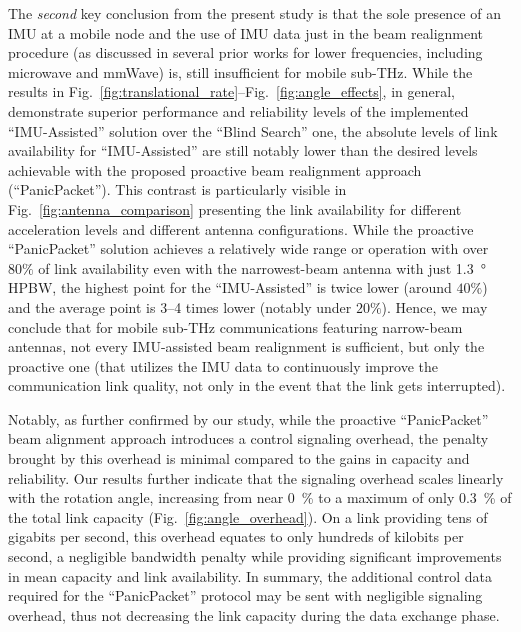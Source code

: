 \documentclass[fleqn,10pt]{wlscirep}
\begin{document}
The \emph{second} key conclusion from the present study is that the sole presence of an IMU at a mobile node and the use of IMU data just in the beam realignment procedure (as discussed in several prior works for lower frequencies, including microwave and mmWave) is, still insufficient for mobile sub-THz. While the results in Fig.~\ref{fig:translational_rate}--Fig.~\ref{fig:angle_effects}, in general, demonstrate superior performance and reliability levels of the implemented ``IMU-Assisted'' solution over the ``Blind Search'' one, the absolute levels of link availability for ``IMU-Assisted'' are still notably lower than the desired levels achievable with the proposed proactive beam realignment approach (``PanicPacket''). This contrast is particularly visible in Fig.~\ref{fig:antenna_comparison} presenting the link availability for different acceleration levels and different antenna configurations. While the proactive ``PanicPacket'' solution achieves a relatively wide range or operation with over $80\%$ of link availability even with the narrowest-beam antenna with just \SI{1.3}{\degree} HPBW, the highest point for the ``IMU-Assisted'' is twice lower (around $40\%$) and the average point is 3--4 times lower (notably under $20\%$). Hence, we may conclude that for mobile sub-THz communications featuring narrow-beam antennas, not every IMU-assisted beam realignment is sufficient, but only the proactive one (that utilizes the IMU data to continuously improve the communication link quality, not only in the event that the link gets interrupted).

Notably, as further confirmed by our study, while the proactive ``PanicPacket'' beam alignment approach introduces a control signaling overhead, the penalty brought by this overhead is minimal compared to the gains in capacity and reliability. Our results further indicate that the signaling overhead scales linearly with the rotation angle, increasing from near \SI{0}{\percent} to a maximum of only \SI{0.3}{\percent} of the total link capacity (Fig.~\ref{fig:angle_overhead}). On a link providing tens of gigabits per second, this overhead equates to only hundreds of kilobits per second, a negligible bandwidth penalty while providing significant improvements in mean capacity and link availability. In summary, the additional control data required for the ``PanicPacket'' protocol may be sent with negligible signaling overhead, thus not decreasing the link capacity during the data exchange phase.
\end{document}
